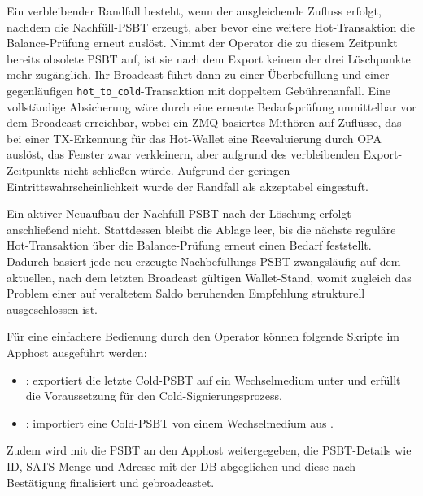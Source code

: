 Ein verbleibender Randfall besteht, wenn der ausgleichende Zufluss erfolgt, nachdem die Nachfüll-\ac{PSBT} erzeugt, aber bevor eine weitere Hot-Transaktion die Balance-Prüfung erneut auslöst. Nimmt der Operator die zu diesem Zeitpunkt bereits obsolete \ac{PSBT} auf, ist sie nach dem Export keinem der drei Löschpunkte mehr zugänglich. Ihr Broadcast führt dann zu einer Überbefüllung und einer gegenläufigen \texttt{hot\_to\_cold}-Transaktion mit doppeltem Gebührenanfall. Eine vollständige Absicherung wäre durch eine erneute Bedarfsprüfung unmittelbar vor dem Broadcast erreichbar, wobei ein \ac{ZMQ}-basiertes Mithören auf Zuflüsse, das bei einer \ac{TX}-Erkennung für das Hot-Wallet eine Reevaluierung durch \ac{OPA} auslöst, das Fenster zwar verkleinern, aber aufgrund des verbleibenden Export-Zeitpunkts nicht schließen würde. Aufgrund der geringen Eintrittswahrscheinlichkeit wurde der Randfall als akzeptabel eingestuft.

Ein aktiver Neuaufbau der Nachfüll-\ac{PSBT} nach der Löschung erfolgt anschließend nicht. Stattdessen bleibt die Ablage leer, bis die nächste reguläre Hot-Transaktion über die Balance-Prüfung erneut einen Bedarf feststellt. Dadurch basiert jede neu erzeugte Nachbefüllungs-\ac{PSBT} zwangsläufig auf dem aktuellen, nach dem letzten Broadcast gültigen Wallet-Stand, womit zugleich das Problem einer auf veraltetem Saldo beruhenden Empfehlung strukturell ausgeschlossen ist.

Für eine einfachere Bedienung durch den Operator können folgende Skripte im Apphost ausgeführt werden:
\begin{itemize}
    \item {}: exportiert die letzte Cold-\ac{PSBT} auf ein Wechselmedium unter  und erfüllt die Voraussetzung für den Cold-Signierungsprozess.
    \item {}: importiert eine Cold-\ac{PSBT} von einem Wechselmedium aus .
\end{itemize}

Zudem wird mit  die \ac{PSBT} an den Apphost weitergegeben, die \ac{PSBT}-Details wie \ac{ID}, \ac{SATS}-Menge und Adresse mit der \ac{DB} abgeglichen und diese nach Bestätigung finalisiert und gebroadcastet.


